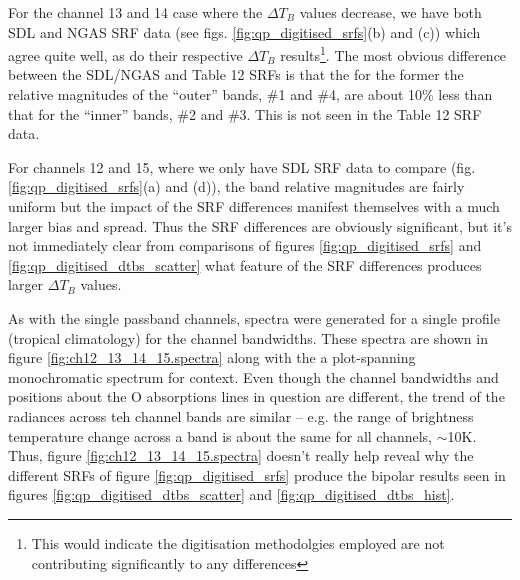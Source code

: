 For the channel 13 and 14 case where the $\Delta T_B$ values decrease, we have both SDL and NGAS SRF data (see figs. \ref{fig:qp_digitised_srfs}(b) and (c)) which agree quite well, as do their respective $\Delta T_B$ results\footnote{This would indicate the digitisation methodolgies employed are not contributing significantly to any differences}. The most obvious difference between the SDL/NGAS and Table 12 SRFs is that the for the former the relative magnitudes of the ``outer'' bands, \#1 and \#4, are about 10\% less than that for the ``inner'' bands, \#2 and \#3. This is not seen in the Table 12 SRF data.

For channels 12 and 15, where we only have SDL SRF data to compare (fig.\ref{fig:qp_digitised_srfs}(a) and (d)), the band relative magnitudes are fairly uniform but the impact of the SRF differences manifest themselves with a much larger bias and spread. Thus the SRF differences are obviously significant, but it's not immediately clear from comparisons of figures \ref{fig:qp_digitised_srfs} and \ref{fig:qp_digitised_dtbs_scatter} what feature of the SRF differences produces larger $\Delta T_B$ values.

As with the single passband channels, spectra were generated for a single profile (tropical climatology) for the channel bandwidths. These spectra are shown in figure \ref{fig:ch12_13_14_15.spectra} along with the a plot-spanning monochromatic spectrum for context. Even though the channel bandwidths and positions about the O absorptions lines in question are different, the trend of the radiances across teh channel bands are similar -- e.g. the range of brightness temperature change across a band is about the same for all channels, $\sim$10K. Thus, figure \ref{fig:ch12_13_14_15.spectra} doesn't really help reveal why the different SRFs of figure \ref{fig:qp_digitised_srfs} produce the bipolar results seen in figures \ref{fig:qp_digitised_dtbs_scatter} and \ref{fig:qp_digitised_dtbs_hist}.

